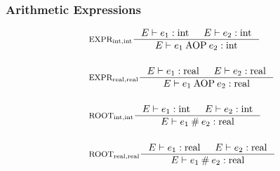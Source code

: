 \subsubsection{Arithmetic Expressions}
\begin{align*}
&\inference[$\text{EXPR}_{\Tint,\Tint}$]{\Tenv e_1  : \Tint & 
                       \Tenv e_2 : \Tint}
                    {\Tenv e_1 \mathbin{\Taop} e_2 : \Tint}
\\\\
&\inference[$\text{EXPR}_{\Treal,\Treal}$]{\Tenv e_1 : \Treal & 
                       \Tenv e_2 : \Treal}
                    {\Tenv e_1 \mathbin{\Taop} e_2 : \Treal}
\\\\
&\inference[$\text{ROOT}_{\Tint,\Tint}$]{\Tenv e_1 : \Tint &
                       \Tenv e_2 : \Tint}
                    {\Tenv e_1 \mathbin{\#} e_2 : \Treal}
\\\\
&\inference[$\text{ROOT}_{\Treal,\Treal}$]{\Tenv e_1 : \Treal &
                       \Tenv e_2 : \Treal}
                    {\Tenv e_1 \mathbin{\#} e_2 : \Treal}
\end{align*}

